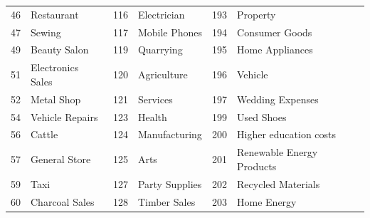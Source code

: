 \begin{longtable}[]{|r|l|r|l|r|l|}
    46                                & Restaurant                         & 116                               & Electrician                        & 193                               & Property                           \\
    47                                & Sewing                             & 117                               & Mobile Phones                      & 194                               & Consumer Goods                     \\
    49                                & Beauty Salon                       & 119                               & Quarrying                          & 195                               & Home Appliances                    \\
    51                                & Electronics Sales                  & 120                               & Agriculture                        & 196                               & Vehicle                            \\
    52                                & Metal Shop                         & 121                               & Services                           & 197                               & Wedding Expenses                   \\
    54                                & Vehicle Repairs                    & 123                               & Health                             & 199                               & Used Shoes                         \\
    56                                & Cattle                             & 124                               & Manufacturing                      & 200                               & Higher education costs             \\
    57                                & General Store                      & 125                               & Arts                               & 201                               & Renewable Energy Products          \\
    59                                & Taxi                               & 127                               & Party Supplies                     & 202                               & Recycled Materials                 \\
    60                                & Charcoal Sales                     & 128                               & Timber Sales                       & 203                               & Home Energy                        \\

\end{longtable}
